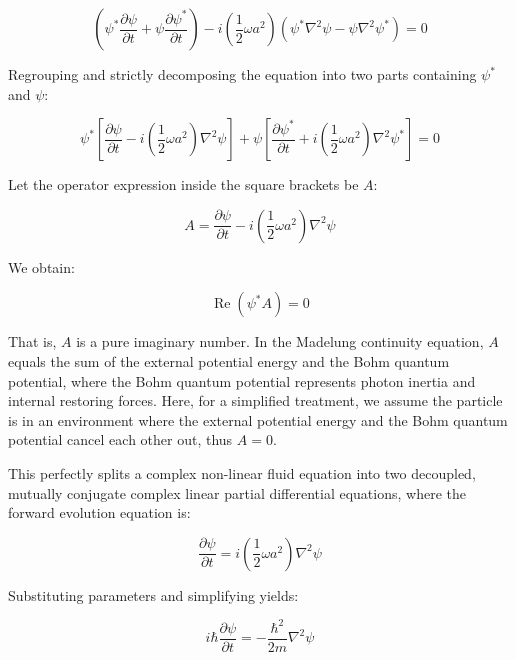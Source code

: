 \documentclass[12pt, a4paper]{article}
\begin{document}
\begin{equation}
\left( \psi^* \frac{\partial \psi}{\partial t} + \psi \frac{\partial \psi^*}{\partial t} \right) - i \left(\frac{1}{2}\omega a^2\right) \left( \psi^* \nabla^2 \psi - \psi \nabla^2 \psi^* \right) = 0 
\end{equation}

Regrouping and strictly decomposing the equation into two parts containing $\psi^*$ and $\psi$:

\begin{equation}
\psi^* \left[ \frac{\partial \psi}{\partial t} - i \left(\frac{1}{2}\omega a^2\right) \nabla^2 \psi \right] + \psi \left[ \frac{\partial \psi^*}{\partial t} + i \left(\frac{1}{2}\omega a^2\right) \nabla^2 \psi^* \right] = 0 
\end{equation}

Let the operator expression inside the square brackets be $A$:

\begin{equation}
A = \frac{\partial \psi}{\partial t} - i \left(\frac{1}{2}\omega a^2\right) \nabla^2 \psi 
\end{equation}

We obtain:

\begin{equation}
\operatorname{Re}(\psi^* A) = 0 
\end{equation}

That is, $A$ is a pure imaginary number. In the Madelung continuity equation, $A$ equals the sum of the external potential energy and the Bohm quantum potential, where the Bohm quantum potential represents photon inertia and internal restoring forces. Here, for a simplified treatment, we assume the particle is in an environment where the external potential energy and the Bohm quantum potential cancel each other out, thus $A=0$.

This perfectly splits a complex non-linear fluid equation into two decoupled, mutually conjugate complex linear partial differential equations, where the forward evolution equation is:

\begin{equation}
\frac{\partial \psi}{\partial t} = i \left(\frac{1}{2}\omega a^2\right) \nabla^2 \psi 
\end{equation}

Substituting parameters and simplifying yields:

\begin{equation}
i\hbar \frac{\partial \psi}{\partial t} = -\frac{\hbar^2}{2m} \nabla^2 \psi 
\end{equation}
\end{document}
